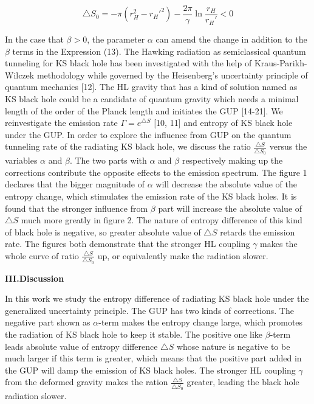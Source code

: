 \documentclass[graphicx, 12pt]{article}
\begin{document}
\begin{equation}
\triangle
S_{0}=-\pi(r_{H}^{2}-r_{H}'^{2})-\frac{2\pi}{\gamma}\ln\frac{r_{H}}{r_{H}'}
<0
\end{equation}

\noindent In the case that $\beta>0$, the parameter $\alpha$ can
amend the change in addition to the $\beta$ terms in the
Expression (13). The Hawking radiation as semiclassical quantum
tunneling for KS black hole has been investigated with the help of
Kraus-Parikh-Wilczek methodology while governed by the
Heisenberg's uncertainty principle of quantum mechanics [12]. The
HL gravity that has a kind of solution named as KS black hole
could be a candidate of quantum gravity which needs a minimal
length of the order of the Planck length and initiates the GUP
[14-21]. We reinvestigate the emission rate $\Gamma=e^{\triangle
S}$ [10, 11] and entropy of KS black hole under the GUP. In order
to explore the influence from GUP on the quantum tunneling rate of
the radiating KS black hole, we discuss the ratio $\frac{\triangle
S}{\triangle S_{0}}$ versus the variables $\alpha$ and $\beta$.
The two parts with $\alpha$ and $\beta$ respectively making up the
corrections contribute the opposite effects to the emission
spectrum. The figure 1 declares that the bigger magnitude of
$\alpha$ will decrease the absolute value of the entropy change,
which stimulates the emission rate of the KS black holes. It is
found that the stronger influence from $\beta$ part will increase
the absolute value of $\triangle S$ much more greatly in figure 2.
The nature of entropy difference of this kind of black hole is
negative, so greater absolute value of $\triangle S$ retards the
emission rate. The figures both demonstrate that the stronger HL
coupling $\gamma$ makes the whole curve of ratio $\frac{\triangle
S}{\triangle S_{0}}$ up, or equivalently make the radiation
slower.


\vspace{0.8cm} \noindent \textbf{III.\hspace{0.4cm}Discussion}

In this work we study the entropy difference of radiating KS black
hole under the generalized uncertainty principle. The GUP has two
kinds of corrections. The negative part shown as $\alpha$-term
makes the entropy change large, which promotes the radiation of KS
black hole to keep it stable. The positive one like $\beta$-term
leads absolute value of entropy difference $\triangle S$ whose
nature is negative to be much larger if this term is greater,
which means that the positive part added in the GUP will damp the
emission of KS black holes. The stronger HL coupling $\gamma$ from
the deformed gravity makes the ration $\frac{\triangle
S}{\triangle S_{0}}$ greater, leading the black hole radiation
slower.
\end{document}
